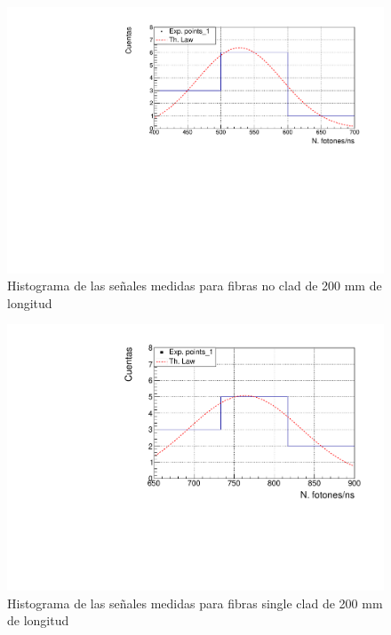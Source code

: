 \begin{figure}[hbtp]
\centering
\includegraphics[scale=0.7]{Figuras/Nocladgauspos.pdf}
\caption{Histograma de las señales medidas para fibras no clad de 200 mm de longitud\label{posnoclad}}
\end{figure}

\begin{figure}[hbtp]
\centering
\includegraphics[scale=0.7]{Figuras/singlecladgauspos.pdf}
\caption{Histograma de las señales medidas para fibras single clad de 200 mm de longitud\label{possingleclad}}
\end{figure}

